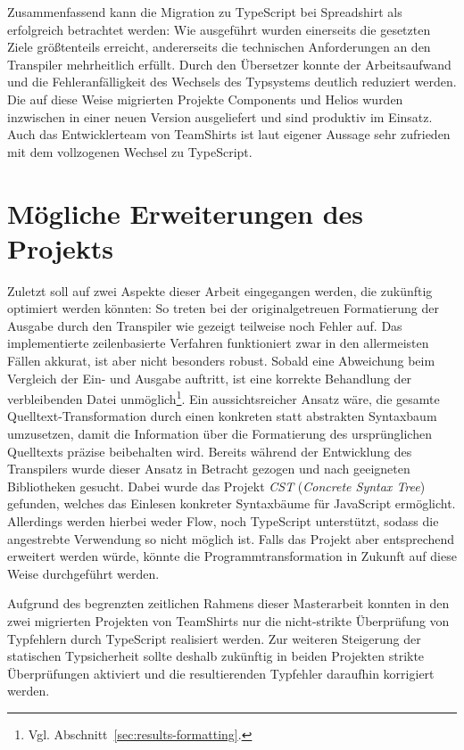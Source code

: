 Zusammenfassend kann die Migration zu TypeScript bei Spreadshirt als erfolgreich betrachtet werden: Wie ausgeführt wurden einerseits die gesetzten Ziele größtenteils erreicht, andererseits die technischen Anforderungen an den Transpiler mehrheitlich erfüllt. Durch den Übersetzer konnte der Arbeitsaufwand und die Fehleranfälligkeit des Wechsels des Typsystems deutlich reduziert werden. Die auf diese Weise migrierten Projekte Components und Helios wurden inzwischen in einer neuen Version ausgeliefert und sind produktiv im Einsatz. Auch das Entwicklerteam von TeamShirts ist laut eigener Aussage sehr zufrieden mit dem vollzogenen Wechsel zu TypeScript.

\section{Mögliche Erweiterungen des Projekts}

Zuletzt soll auf zwei Aspekte dieser Arbeit eingegangen werden, die zukünftig optimiert werden könnten: So treten bei der originalgetreuen Formatierung der Ausgabe durch den Transpiler wie gezeigt teilweise noch Fehler auf. Das implementierte zeilenbasierte Verfahren funktioniert zwar in den allermeisten Fällen akkurat, ist aber nicht besonders robust. Sobald eine Abweichung beim Vergleich der Ein- und Ausgabe auftritt, ist eine korrekte Behandlung der verbleibenden Datei unmöglich\footnote{Vgl. Abschnitt~\ref{sec:results-formatting}.}. Ein aussichtsreicher Ansatz wäre, die gesamte Quelltext-Transformation durch einen konkreten statt abstrakten Syntaxbaum umzusetzen, damit die Information über die Formatierung des ursprünglichen Quelltexts präzise beibehalten wird. Bereits während der Entwicklung des Transpilers wurde dieser Ansatz in Betracht gezogen und nach geeigneten Bibliotheken gesucht. Dabei wurde das Projekt \textit{CST} (\textit{Concrete Syntax Tree})~\autocite{SOFTWARE:CST} gefunden, welches das Einlesen konkreter Syntaxbäume für JavaScript ermöglicht. Allerdings werden hierbei weder Flow, noch TypeScript unterstützt, sodass die angestrebte Verwendung so nicht möglich ist. Falls das Projekt aber entsprechend erweitert werden würde, könnte die Programmtransformation in Zukunft auf diese Weise durchgeführt werden.

Aufgrund des begrenzten zeitlichen Rahmens dieser Masterarbeit konnten in den zwei migrierten Projekten von TeamShirts nur die nicht-strikte Überprüfung von Typfehlern durch TypeScript realisiert werden. Zur weiteren Steigerung der statischen Typsicherheit sollte deshalb zukünftig in beiden Projekten strikte Überprüfungen aktiviert und die resultierenden Typfehler daraufhin korrigiert werden.
